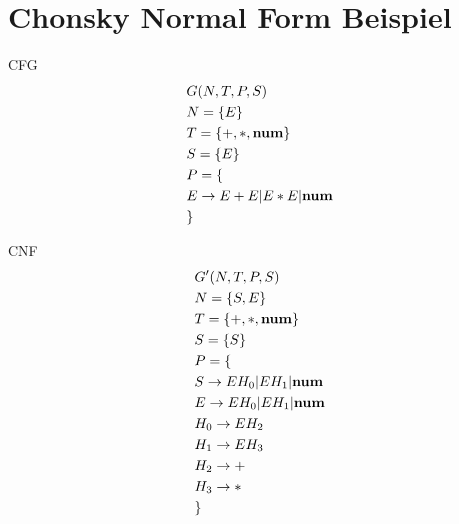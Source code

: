 \documentclass[t]{beamer}
\begin{document}
    \section{Chonsky Normal Form Beispiel}\label{sec:chonsky-normal-form-beispiel}
    \begin{frame}
        \centering
        \vspace{-1em}
        \begin{minipage}[c]{0.4\textwidth}
            \begin{block}{CFG}
                \vspace{-1em}
                \begin{align*}
                    & G(N,T,P,S) \\
                    & N= \{E\} \\
                    & T= \{+, *, \bold{num}\} \\
                    & S= \{E\}  \\
                    & P = \{ \\
                    & E \rightarrow E + E | E * E | \bold{num} \\
                    & \}
                \end{align*}
            \end{block}
        \end{minipage}%
        \quad%
        \quad%
        \begin{minipage}[c]{0.4\textwidth}%
            \begin{block}{CNF}
                \vspace{-1em}
                \begin{align*}
                    & G'(N,T,P,S) \\
                    & N= \{S, E\} \\
                    & T= \{+, *, \bold{num}\} \\
                    & S= \{S\}  \\
                    & P = \{ \\
                    & S \rightarrow E H_0 | E H_1 | \bold{num} \\
                    & E \rightarrow E H_0 | E H_1 | \bold{num} \\
                    & H_0 \rightarrow E H_2 \\
                    & H_1 \rightarrow E H_3 \\
                    & H_2 \rightarrow + \\
                    & H_3 \rightarrow * \\
                    & \}
                \end{align*}
            \end{block}
        \end{minipage}
    \end{frame}
\end{document}
